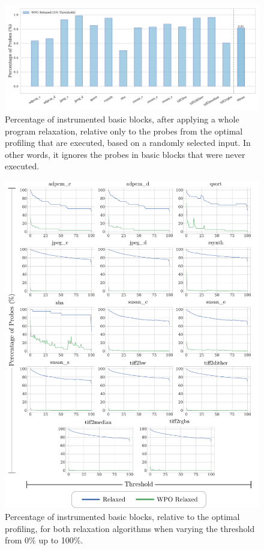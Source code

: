 \begin{figure}[ht]
    \centering
    \includegraphics[width=\textwidth]{figs/wpo-nonzero-probes-relative-to-optimal.pdf}
    \caption{Percentage of instrumented basic blocks, after applying a whole program relaxation, relative only to the probes from the optimal profiling that are executed, based on a randomly selected input. In other words, it ignores the probes in basic blocks that were never executed.}
    \label{fig:wpo-nonzero-probes-relative-to-optimal}
\end{figure}

\begin{figure}[h!]
    \centering
    \includegraphics[width=\textwidth]{figs/instr-all-thresholds.pdf}
    \caption{Percentage of instrumented basic blocks, relative to the optimal profiling, for both relaxation algorithms when varying the threshold from 0\% up to 100\%.}
    \label{fig:instr-all-thresholds}
\end{figure}

